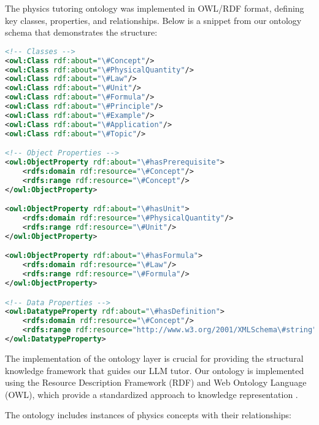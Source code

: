 The physics tutoring ontology was implemented in OWL/RDF format, defining key classes, properties, and relationships. Below is a snippet from our ontology schema that demonstrates the structure:

\begin{lstlisting}[language=XML, caption=Physics Tutor Ontology Schema, label=lst:ontology]
<!-- Classes -->
<owl:Class rdf:about="\#Concept"/>
<owl:Class rdf:about="\#PhysicalQuantity"/>
<owl:Class rdf:about="\#Law"/>
<owl:Class rdf:about="\#Unit"/>
<owl:Class rdf:about="\#Formula"/>
<owl:Class rdf:about="\#Principle"/>
<owl:Class rdf:about="\#Example"/>
<owl:Class rdf:about="\#Application"/>
<owl:Class rdf:about="\#Topic"/>

<!-- Object Properties -->
<owl:ObjectProperty rdf:about="\#hasPrerequisite">
    <rdfs:domain rdf:resource="\#Concept"/>
    <rdfs:range rdf:resource="\#Concept"/>
</owl:ObjectProperty>

<owl:ObjectProperty rdf:about="\#hasUnit">
    <rdfs:domain rdf:resource="\#PhysicalQuantity"/>
    <rdfs:range rdf:resource="\#Unit"/>
</owl:ObjectProperty>

<owl:ObjectProperty rdf:about="\#hasFormula">
    <rdfs:domain rdf:resource="\#Law"/>
    <rdfs:range rdf:resource="\#Formula"/>
</owl:ObjectProperty>

<!-- Data Properties -->
<owl:DatatypeProperty rdf:about="\#hasDefinition">
    <rdfs:domain rdf:resource="\#Concept"/>
    <rdfs:range rdf:resource="http://www.w3.org/2001/XMLSchema\#string"/>
</owl:DatatypeProperty>
\end{lstlisting}

The implementation of the ontology layer is crucial for providing the structural knowledge framework that guides our LLM tutor. Our ontology is implemented using the Resource Description Framework (RDF) and Web Ontology Language (OWL), which provide a standardized approach to knowledge representation \cite{horrocks2024owl}.

The ontology includes instances of physics concepts with their relationships:

